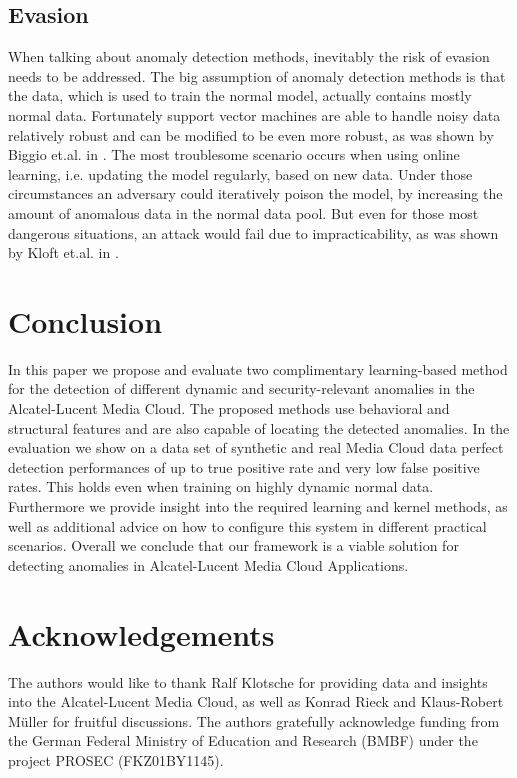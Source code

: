 \documentclass{llncs}
\begin{document}
 \subsection{Evasion}
\label{evasion}
When talking about anomaly detection methods, inevitably the risk of evasion needs to be addressed. The big assumption of anomaly detection methods is that the data, which is used to train the normal model, actually contains mostly normal data. Fortunately support vector machines are able to handle noisy data relatively robust and can be modified to be even more robust, as was shown by Biggio et.al. in \cite{BigNelLas11}. The most troublesome scenario occurs when using online learning, i.e. updating the model regularly, based on new data. Under those circumstances an adversary could iteratively poison the model, by increasing the amount of anomalous data in the normal data pool. But even for those most dangerous situations, an attack would fail due to impracticability, as was shown by Kloft et.al. in \cite{KloLas12}.
  
\section{Conclusion}
\label{sec:conclusion}

In this paper we propose and evaluate two complimentary learning-based method for the detection of different dynamic and security-relevant anomalies in the Alcatel-Lucent Media Cloud. The proposed methods use behavioral and structural features and are also capable of locating the detected anomalies. In the evaluation we show on a data set of synthetic and real Media Cloud data perfect detection performances of up to  true positive rate and very low false positive rates. This holds even when training on highly dynamic normal data. Furthermore we provide insight into the required learning and kernel methods, as well as additional advice on how to configure this system in different practical scenarios. Overall we conclude that our framework is a viable solution for detecting anomalies in Alcatel-Lucent Media Cloud Applications.

 \section{Acknowledgements}
\label{acknowledgements}
The authors would like to thank Ralf Klotsche for providing data and insights into the Alcatel-Lucent Media Cloud, as well as Konrad Rieck and Klaus-Robert M\"uller for fruitful discussions. The authors gratefully acknowledge funding from the German Federal Ministry of Education and Research (BMBF) under the project PROSEC (FKZ01BY1145).
 



\end{document}

